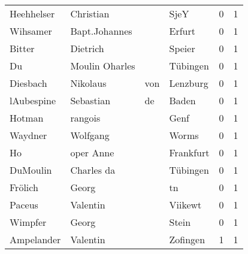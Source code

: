 \begin{center}
\begin{tiny}
\begin{longtabu}{llllrr}
               Heehhelser &                          Christian &             &                                        SjeY &          0 &         1 \\
                 Wihsamer &                      Bapt.Johannes &             &                                      Erfurt &          0 &         1 \\
                   Bitter &                           Dietrich &             &                                      Speier &          0 &         1 \\
                       Du &                     Moulin Oharles &             &                                    Tübingen &          0 &         1 \\
                 Diesbach &                           Nikolaus &         von &                                    Lenzburg &          0 &         1 \\
               lAubespine &                          Sebastian &          de &                                       Baden &          0 &         1 \\
                   Hotman &                            rangois &             &                                        Genf &          0 &         1 \\
                  Waydner &                           Wolfgang &             &                                       Worms &          0 &         1 \\
                       Ho &                          oper Anne &             &                                   Frankfurt &          0 &         1 \\
                 DuMoulin &                         Charles da &             &                                    Tübingen &          0 &         1 \\
                  Frölich &                              Georg &             &                                          tn &          0 &         1 \\
                   Paceus &                           Valentin &             &                                     Viikewt &          0 &         1 \\
                  Wimpfer &                              Georg &             &                                       Stein &          0 &         1 \\
               Ampelander &                           Valentin &             &                                    Zofingen &          1 &         1 \\

\end{longtabu}
\end{tiny}
\end{center}
